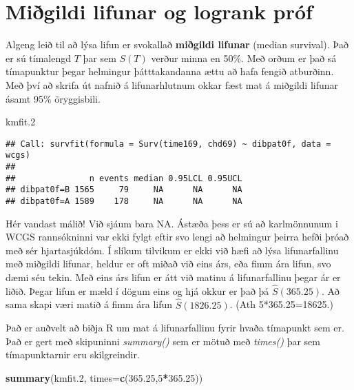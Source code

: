 \documentclass[
]{book}
\newenvironment{Shaded}{\begin{snugshade}}{\end{snugshade}}
\newcommand{\DataTypeTok}[1]{\textcolor[rgb]{0.13,0.29,0.53}{#1}}
\newcommand{\DecValTok}[1]{\textcolor[rgb]{0.00,0.00,0.81}{#1}}
\newcommand{\FloatTok}[1]{\textcolor[rgb]{0.00,0.00,0.81}{#1}}
\newcommand{\KeywordTok}[1]{\textcolor[rgb]{0.13,0.29,0.53}{\textbf{#1}}}
\newcommand{\NormalTok}[1]{#1}
\newcommand{\OperatorTok}[1]{\textcolor[rgb]{0.81,0.36,0.00}{\textbf{#1}}}
\begin{document}
\hypertarget{miuxf0gildi-lifunar-og-logrank-pruxf3f}{%
\section{Miðgildi lifunar og logrank próf}\label{miuxf0gildi-lifunar-og-logrank-pruxf3f}}

Algeng leið til að lýsa lifun er svokallað \textbf{miðgildi lifunar} (median survival). Það er sú tímalengd \(T\) þar sem \(S(T)\) verður minna en 50\%. Með orðum er það sá tímapunktur þegar helmingur þátttakandanna ættu að hafa fengið atburðinn. Með því að skrifa út nafnið á lifunarhlutnum okkar fæst mat á miðgildi lifunar ásamt 95\% öryggisbili.

\begin{Shaded}
\begin{Highlighting}[]
\NormalTok{kmfit}\FloatTok{.2}
\end{Highlighting}
\end{Shaded}

\begin{verbatim}
## Call: survfit(formula = Surv(time169, chd69) ~ dibpat0f, data = wcgs)
## 
##               n events median 0.95LCL 0.95UCL
## dibpat0f=B 1565     79     NA      NA      NA
## dibpat0f=A 1589    178     NA      NA      NA
\end{verbatim}

Hér vandast málið! Við sjáum bara NA. Ástæða þess er sú að karlmönnunum i WCGS rannsókninni var ekki fylgt eftir svo lengi að helmingur þeirra hefði þróað með sér hjartasjúkdóm. Í slíkum tilvikum er ekki við hæfi að lýsa lifunarfallinu með miðgildi lifunar, heldur er oft miðað við eins árs, eða fimm ára lifun, svo dæmi séu tekin. Með eins árs lifun er átt við matinu á lifunarfallinu þegar ár er liðið. Þegar lifun er mæld í dögum eins og hjá okkur er það þá \(\hat S(365.25)\). Að sama skapi væri matið á fimm ára lifun \(\hat S(1826.25)\). (Ath 5*365.25=18625.)

Það er auðvelt að biðja R um mat á lifunarfallinu fyrir hvaða tímapunkt sem er. Það er gert með skipuninni \emph{summary()} sem er mötuð með \emph{times()} þar sem tímapunktarnir eru skilgreindir.

\begin{Shaded}
\begin{Highlighting}[]
\KeywordTok{summary}\NormalTok{(kmfit}\FloatTok{.2}\NormalTok{, }\DataTypeTok{times=}\KeywordTok{c}\NormalTok{(}\FloatTok{365.25}\NormalTok{,}\DecValTok{5}\OperatorTok{*}\FloatTok{365.25}\NormalTok{))}
\end{Highlighting}
\end{Shaded}
\end{document}
